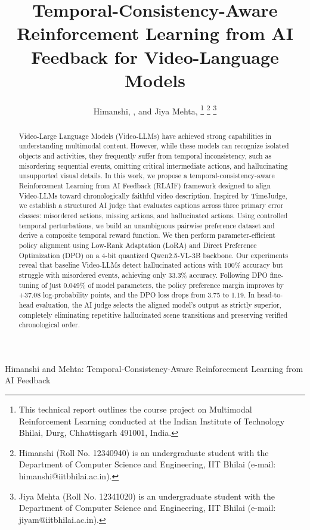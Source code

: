 \documentclass[journal]{IEEEtai}
\begin{document}
\title{Temporal-Consistency-Aware Reinforcement Learning from AI Feedback for Video-Language Models}

\author{Himanshi, , and Jiya Mehta, 
\thanks{This technical report outlines the course project on Multimodal Reinforcement Learning conducted at the Indian Institute of Technology Bhilai, Durg, Chhattisgarh 491001, India.}
\thanks{Himanshi (Roll No. 12340940) is an undergraduate student with the Department of Computer Science and Engineering, IIT Bhilai (e-mail: himanshi@iitbhilai.ac.in).}
\thanks{Jiya Mehta (Roll No. 12341020) is an undergraduate student with the Department of Computer Science and Engineering, IIT Bhilai (e-mail: jiyam@iitbhilai.ac.in).}}

{Himanshi and Mehta: Temporal-Consistency-Aware Reinforcement Learning from AI Feedback}

\maketitle

\begin{abstract}
Video-Large Language Models (Video-LLMs) have achieved strong capabilities in understanding multimodal content. However, while these models can recognize isolated objects and activities, they frequently suffer from temporal inconsistency, such as misordering sequential events, omitting critical intermediate actions, and hallucinating unsupported visual details. In this work, we propose a temporal-consistency-aware Reinforcement Learning from AI Feedback (RLAIF) framework designed to align Video-LLMs toward chronologically faithful video description. Inspired by TimeJudge, we establish a structured AI judge that evaluates captions across three primary error classes: misordered actions, missing actions, and hallucinated actions. Using controlled temporal perturbations, we build an unambiguous pairwise preference dataset and derive a composite temporal reward function. We then perform parameter-efficient policy alignment using Low-Rank Adaptation (LoRA) and Direct Preference Optimization (DPO) on a 4-bit quantized Qwen2.5-VL-3B backbone. Our experiments reveal that baseline Video-LLMs detect hallucinated actions with 100\% accuracy but struggle with misordered events, achieving only 33.3\% accuracy. Following DPO fine-tuning of just 0.049\% of model parameters, the policy preference margin improves by +37.08 log-probability points, and the DPO loss drops from 3.75 to 1.19. In head-to-head evaluation, the AI judge selects the aligned model's output as strictly superior, completely eliminating repetitive hallucinated scene transitions and preserving verified chronological order.
\end{abstract}
\end{document}
